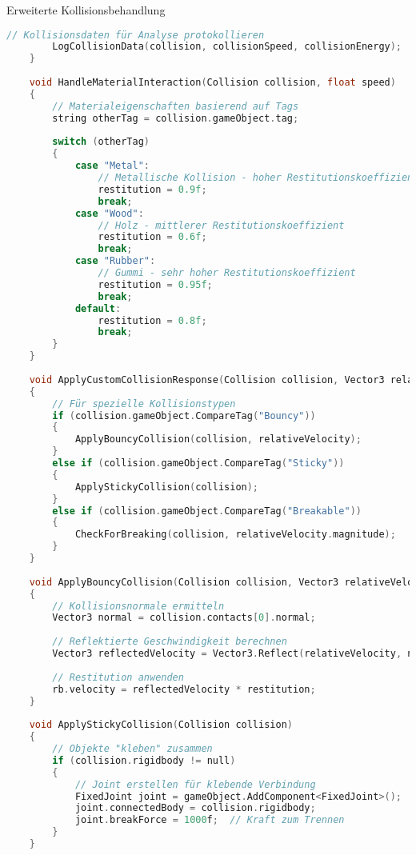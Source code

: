 \begin{code}{Erweiterte Kollisionsbehandlung}
\begin{lstlisting}[language=C, style=basesmol]
        // Kollisionsdaten für Analyse protokollieren
        LogCollisionData(collision, collisionSpeed, collisionEnergy);
    }
    
    void HandleMaterialInteraction(Collision collision, float speed) 
    {
        // Materialeigenschaften basierend auf Tags
        string otherTag = collision.gameObject.tag;
        
        switch (otherTag) 
        {
            case "Metal":
                // Metallische Kollision - hoher Restitutionskoeffizient
                restitution = 0.9f;
                break;
            case "Wood":
                // Holz - mittlerer Restitutionskoeffizient
                restitution = 0.6f;
                break;
            case "Rubber":
                // Gummi - sehr hoher Restitutionskoeffizient
                restitution = 0.95f;
                break;
            default:
                restitution = 0.8f;
                break;
        }
    }
    
    void ApplyCustomCollisionResponse(Collision collision, Vector3 relativeVelocity) 
    {
        // Für spezielle Kollisionstypen
        if (collision.gameObject.CompareTag("Bouncy")) 
        {
            ApplyBouncyCollision(collision, relativeVelocity);
        }
        else if (collision.gameObject.CompareTag("Sticky")) 
        {
            ApplyStickyCollision(collision);
        }
        else if (collision.gameObject.CompareTag("Breakable")) 
        {
            CheckForBreaking(collision, relativeVelocity.magnitude);
        }
    }
    
    void ApplyBouncyCollision(Collision collision, Vector3 relativeVelocity) 
    {
        // Kollisionsnormale ermitteln
        Vector3 normal = collision.contacts[0].normal;
        
        // Reflektierte Geschwindigkeit berechnen
        Vector3 reflectedVelocity = Vector3.Reflect(relativeVelocity, normal);
        
        // Restitution anwenden
        rb.velocity = reflectedVelocity * restitution;
    }
    
    void ApplyStickyCollision(Collision collision) 
    {
        // Objekte "kleben" zusammen
        if (collision.rigidbody != null) 
        {
            // Joint erstellen für klebende Verbindung
            FixedJoint joint = gameObject.AddComponent<FixedJoint>();
            joint.connectedBody = collision.rigidbody;
            joint.breakForce = 1000f;  // Kraft zum Trennen
        }
    }
    

\end{lstlisting}
\end{code}
